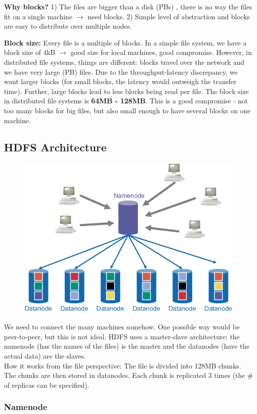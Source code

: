 \documentclass[11pt,oneside,a4paper]{article}
\begin{document}
\textbf{Why blocks?} 1) The files are bigger than a disk (PBs) , there is no way the files fit on a single machine $\rightarrow$ need blocks. 2) Simple level of abstraction and blocks are easy to distribute over multiple nodes.

\textbf{Block size:} Every file is a multiple of blocks. In a simple file system, we have a block size of 4kB $\rightarrow$ good size for local machines, good compromise. However, in distributed file systems, things are different: blocks travel over the network and we have very large (PB) files. Due to the throughput-latency discrepancy, we want larger blocks (for small blocks, the latency would outweigh the transfer time). Further, large blocks lead to less blocks being read per file. The block size in distributed file systems is \textbf{64MB - 128MB}. This is a good compromise - not too many blocks for big files, but also small enough to have several blocks on one machine.\\

\subsection{HDFS Architecture}

\begin{figure}[hb!]
	\centering
	\includegraphics[width=0.3\linewidth]{figures/hdfs_architecture}
	\label{fig:hdfsarchitecture}
\end{figure}


We need to connect the many machines somehow. One possible way would be peer-to-peer, but this is not ideal. HDFS uses a master-slave architecture: the namenode (has the names of the files) is the master and the datanodes (have the actual data) are the slaves.\\
How it works from the file perspective: The file is divided into 128MB chunks. The chunks are then stored in datanodes. Each chunk is replicated 3 times (the \# of replicas can be specified).

\subsubsection{Namenode}
\end{document}
